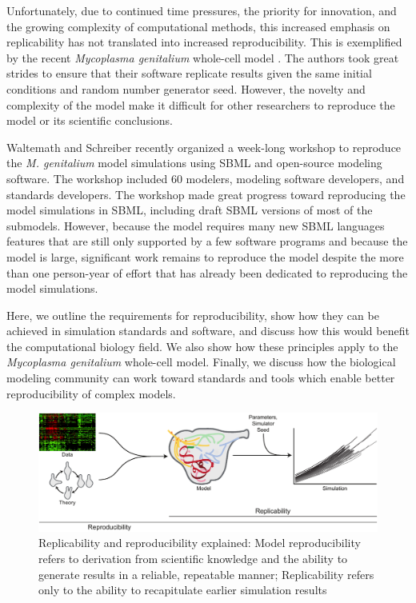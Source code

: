 \documentclass[journal,transmag,twoside]{IEEEtran}
\begin{document}
Unfortunately, due to continued time pressures, the priority for innovation, and the growing complexity of computational methods, this increased emphasis on replicability has not translated into increased reproducibility. This is exemplified by the recent \textit{Mycoplasma genitalium} whole-cell model \cite{Karr2012}. The authors took great strides to ensure that their software replicate results given the same initial conditions and random number generator seed. However, the novelty and complexity of the model make it difficult for other researchers to reproduce the model or its scientific conclusions. 

Waltemath and Schreiber recently organized a week-long workshop to reproduce the \textit{M. genitalium} model simulations using SBML and open-source modeling software. The workshop included 60 modelers, modeling software developers, and standards developers. The workshop made great progress toward reproducing the model simulations in SBML, including draft SBML versions of most of the submodels. However, because the model requires many new SBML languages features that are still only supported by a few software programs and because the model is large, significant work remains to reproduce the model despite the more than one person-year of effort that has already been dedicated to reproducing the model simulations.

Here, we outline the requirements for reproducibility, show how they can
be achieved in simulation standards and software, and discuss how this would benefit
the computational biology field. We also show how these principles apply to the \textit{Mycoplasma genitalium} whole-cell
model.
Finally, we discuss how the biological modeling community can work toward standards
and tools which enable better reproducibility of complex models.

\begin{figure}[!t]
\centering
\includegraphics[width=\textwidth]{figure1/figure1}
\caption{Replicability and reproducibility explained: Model reproducibility refers to derivation from scientific knowledge and the ability to generate results in a reliable, repeatable manner;
Replicability refers only to the ability to recapitulate earlier simulation results}
\label{fig_repro_diagram}
\end{figure}
\end{document}
